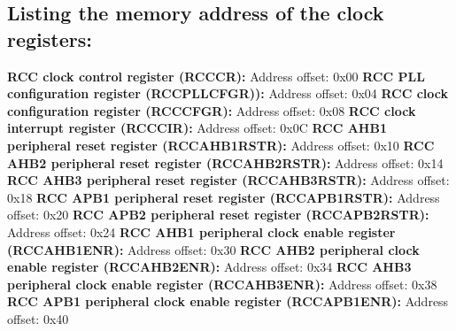 \documentclass{article}
\begin{document}
\subsection{Listing the memory address of the clock registers:}

\textbf{RCC clock control register (RCC\textunderscore CR):} Address offset: 0x00\newline\newline
\textbf{RCC PLL configuration register (RCC\textunderscore PLLCFGR)):} Address offset: 0x04\newline\newline
\textbf{RCC clock configuration register (RCC\textunderscore CFGR):} Address offset: 0x08\newline\newline
\textbf{RCC clock interrupt register (RCC\textunderscore CIR):} Address offset: 0x0C\newline\newline
\textbf{RCC AHB1 peripheral reset register (RCC\textunderscore AHB1RSTR):} Address offset: 0x10\newline\newline
\textbf{RCC AHB2 peripheral reset register (RCC\textunderscore AHB2RSTR):} Address offset: 0x14\newline\newline
\textbf{RCC AHB3 peripheral reset register (RCC\textunderscore AHB3RSTR):} Address offset: 0x18\newline\newline
\textbf{RCC APB1 peripheral reset register (RCC\textunderscore APB1RSTR):} Address offset: 0x20\newline\newline
\textbf{RCC APB2 peripheral reset register (RCC\textunderscore APB2RSTR):} Address offset: 0x24\newline\newline
\textbf{RCC AHB1 peripheral clock enable register (RCC\textunderscore AHB1ENR):} Address offset: 0x30\newline\newline
\textbf{RCC AHB2 peripheral clock enable register (RCC\textunderscore AHB2ENR):} Address offset: 0x34\newline\newline
\textbf{RCC AHB3 peripheral clock enable register (RCC\textunderscore AHB3ENR):} Address offset: 0x38\newline\newline
\textbf{RCC APB1 peripheral clock enable register (RCC\textunderscore APB1ENR):} Address offset: 0x40\newline\newline
\end{document}
